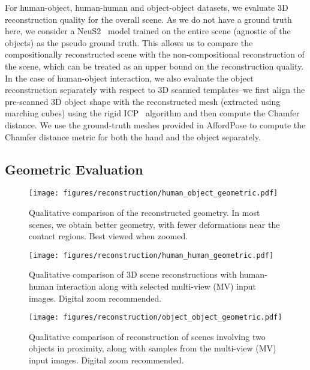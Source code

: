 For human-object, human-human and object-object datasets, we evaluate 3D reconstruction quality for the overall scene. 
As we do not have a ground truth here, we consider a NeuS2~\cite{neus2} model trained on the entire scene (agnostic of the objects) as the pseudo ground truth. 
This allows us to compare the compositionally reconstructed scene with the non-compositional reconstruction of the scene, which can be treated as an upper bound on the reconstruction quality.
In the case of human-object interaction, we also evaluate the object reconstruction separately with respect to 3D scanned templates--we first align the pre-scanned 3D object shape with the reconstructed mesh (extracted using marching cubes) using the rigid ICP~\cite{icp} algorithm and then compute the Chamfer distance. 
We use the ground-truth meshes provided in AffordPose to compute the Chamfer distance metric for both the hand and the object separately. 


\subsection{Geometric Evaluation}
\begin{figure}
    \centering \texttt{[image: figures/reconstruction/human\_object\_geometric.pdf]}
    \caption{Qualitative comparison of the reconstructed geometry. In most scenes, we obtain better geometry, with fewer deformations near the contact regions. Best viewed when zoomed.
    }
    \label{fig:human_object_geometry}
    \vspace{-1em}
\end{figure}
\begin{figure}
    \centering
    \texttt{[image: figures/reconstruction/human\_human\_geometric.pdf]}
    \caption{Qualitative comparison of 3D scene reconstructions with human-human interaction along with selected multi-view (MV) input images. 
    Digital zoom recommended. 
    } 
    \label{fig:human_human_geometry}
    \vspace{-1em}
\end{figure}
\begin{figure}
    \centering    
    \texttt{[image: figures/reconstruction/object\_object\_geometric.pdf]}
    \caption{Qualitative comparison of reconstruction of scenes involving two objects in proximity, along with samples from the multi-view (MV) input images. 
    Digital zoom recommended. 
    } \label{fig:object_object_geometry}
    \vspace{-1em}
\end{figure}

